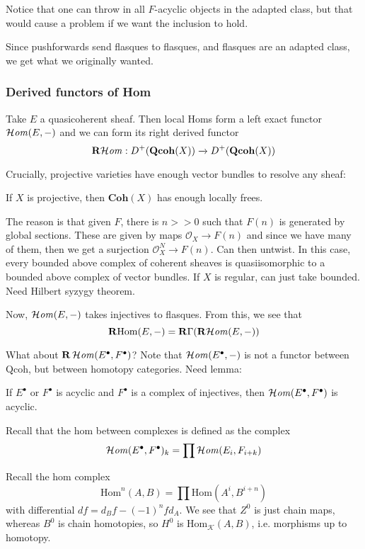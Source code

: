 Notice that one can throw in all $F$-acyclic objects in the adapted class, but that would cause a problem if we want the inclusion to hold.

Since pushforwards send flasques to flasques, and flasques are an adapted class, we get what we originally wanted.

\subsubsection{Derived functors of Hom}

Take $E$ a quasicoherent sheaf. Then local Homs form a left exact functor $\operatorname{\mathcal{H}\mathit{om}}(E,-)$ and we can form its right derived functor $$\operatorname{\mathbf{R}\mathcal{H}\mathit{om}}:D^+(\mathbf{Qcoh}(X))\xrightarrow{}D^+(\mathbf{Qcoh}(X))$$

Crucially, projective varieties have enough vector bundles to resolve any sheaf:

\begin{proposition}{}{}
    If $X$ is projective, then $\mathbf{Coh}(X)$ has enough locally frees.  
\end{proposition}

The reason is that given $F$, there is $n>>0$ such that $F(n)$ is generated by global sections. These are given by maps $\mathcal{O}_{X}\xrightarrow{}F(n)$ and since we have many of them, then we get a surjection $\mathcal{O}_{X}^N\xrightarrow{}F(n)$. Can then untwist. In this case, every bounded above complex of coherent sheaves is quasiisomorphic to a bounded above complex of vector bundles. If $X$ is regular, can just take bounded. Need Hilbert syzygy theorem.

Now, $\operatorname{\mathcal{H}\mathit{om}}(E,-)$ takes injectives to flasques. From this, we see that $$\operatorname{\mathbf{R}Hom}(E,-)=\operatorname{\mathbf{R}\Gamma}(\operatorname{\mathbf{R}\mathcal{H}\mathit{om}}(E,-))$$

What about $\mathbf{R}\operatorname{\mathcal{H}\mathit{om}}(E^\bullet, F^\bullet)$? Note that $\operatorname{\mathcal{H}\mathit{om}}(E^\bullet,-)$ is not a functor between $\mathrm{Qcoh}$, but between homotopy categories. Need lemma:

\begin{lemma}{}{}
    If $E^\bullet$ or $F^\bullet$ is acyclic and $F^\bullet$ is a complex of injectives, then $\operatorname{\mathcal{H}\mathit{om}}(E^\bullet, F^\bullet)$ is acyclic.
\end{lemma}

Recall that the hom between complexes is defined as the complex $$\operatorname{\mathcal{H}\mathit{om}}(E^\bullet, F^\bullet)_{k}=\prod \operatorname{\mathcal{H}\mathit{om}}(E_{i}, F_{i+k})$$

Recall the hom complex $$\mathrm{Hom}^n(A,B)=\prod \mathrm{Hom} (A^i, B^{i+n})$$with differential $df=d_{B}f-(-1)^nfd_{A}$. We see that $Z^0$ is just chain maps, whereas $B^0$ is chain homotopies, so $H^0$ is $\mathrm{Hom}_{\mathcal{K}}(A,B)$, i.e. morphisms up to homotopy. 

